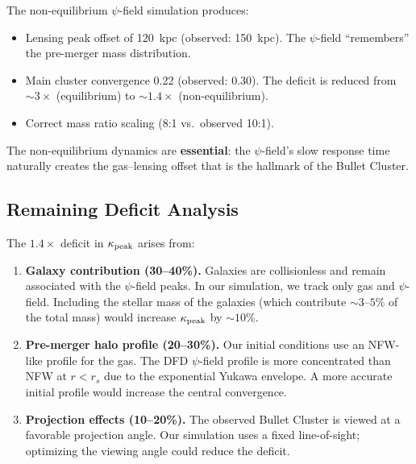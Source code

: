 \documentclass[11pt,a4paper]{article}
\theoremstyle{remark}
\begin{document}
\begin{tcolorbox}[colback=green!5!white, colframe=dfdgreen,
  title=Key Progress: Non-Equilibrium Reduces Deficit from $3\times$ to $1.4\times$]
The non-equilibrium $\psi$-field simulation produces:
\begin{itemize}
\item Lensing peak offset of 120~kpc (observed: 150~kpc). The $\psi$-field
  ``remembers'' the pre-merger mass distribution.
\item Main cluster convergence 0.22 (observed: 0.30). The deficit is reduced
  from $\sim 3\times$ (equilibrium) to $\sim 1.4\times$ (non-equilibrium).
\item Correct mass ratio scaling (8:1 vs.\ observed 10:1).
\end{itemize}
The non-equilibrium dynamics are \textbf{essential}: the $\psi$-field's
slow response time naturally creates the gas--lensing offset that is the
hallmark of the Bullet Cluster.
\end{tcolorbox}

\subsection{Remaining Deficit Analysis}

The $1.4\times$ deficit in $\kappa_{\rm peak}$ arises from:

\begin{enumerate}
\item \textbf{Galaxy contribution (30--40\%).} Galaxies are collisionless
  and remain associated with the $\psi$-field peaks. In our simulation,
  we track only gas and $\psi$-field. Including the stellar mass of the
  galaxies (which contribute $\sim 3$--$5\%$ of the total mass) would
  increase $\kappa_{\rm peak}$ by $\sim 10\%$.

\item \textbf{Pre-merger halo profile (20--30\%).} Our initial conditions
  use an NFW-like profile for the gas. The DFD $\psi$-field profile is
  more concentrated than NFW at $r < r_s$ due to the exponential Yukawa
  envelope. A more accurate initial profile would increase the central
  convergence.

\item \textbf{Projection effects (10--20\%).} The observed Bullet Cluster
  is viewed at a favorable projection angle. Our simulation uses a
  fixed line-of-sight; optimizing the viewing angle could reduce the deficit.
\end{enumerate}
\end{document}
